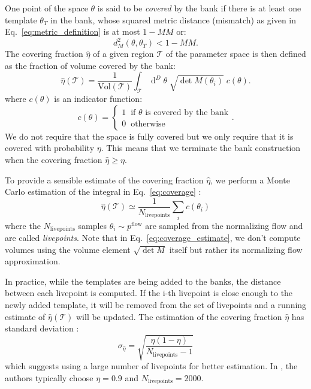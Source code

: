 \documentclass[twocolumn,showpacs,preprintnumbers,nofootinbib,prd,
superscriptaddress,10pt]{revtex4-2}
\newcommand{\dvol}[2]{\ensuremath{\operatorname{d}^{#2}\!{#1}}}
\begin{document}
One point of the space $\theta$ is said to be {\it covered} by the bank if there is at least one template $\theta_T$ in the bank, whose squared metric distance (mismatch) as given in Eq.~\eqref{eq:metric_definition} is at most $1 - MM$ or:
\begin{equation}
	d^2_M(\theta, \theta_T)<1 - MM.
\end{equation}
%
The covering fraction $\hat{\eta}$ of a given region $\mathcal{T}$ of the parameter space is then defined as the fraction of volume covered by the bank:
\begin{equation}\label{eq:coverage}
	\hat{\eta}(\mathcal{T}) = \frac{1}{\text{Vol}(\mathcal{T})} \int_\mathcal{T} \dvol{\theta}{D} \; \sqrt{\det M(\theta_i)} \; c(\theta).
\end{equation}
where $c(\theta)$ is an indicator function:
\begin{equation}
	c(\theta) = \left\{
                \begin{array}{ll}
                  1 \;\; \text{if $\theta$ is covered by the bank}\\
                  0 \;\; \text{otherwise}
                \end{array}.
              \right.
\end{equation}
%
We do not require that the space is fully covered but we only require that it is covered with probability $\eta$. This means that we terminate the bank construction when the covering fraction $\hat{\eta} \geq \eta$.

To provide a sensible estimate of the covering fraction $\hat{\eta}$, we perform a Monte Carlo estimation of the integral in Eq.~\eqref{eq:coverage} \cite{Coogan:2022qxs}:
\begin{equation}\label{eq:coverage_estimate}
	\hat{\eta}(\mathcal{T}) \simeq \frac{1}{N_\text{livepoints}} \sum_i c(\theta_i)
\end{equation}
%
where the $N_\text{livepoints}$ samples $\theta_i \sim p^\text{flow}$ are sampled from the normalizing flow and are called {\it livepoints}.
Note that in Eq.~\eqref{eq:coverage_estimate}, we don't compute volumes using the volume element $\sqrt{\det M}$ itself but rather its normalizing flow approximation.

In practice, while the templates are being added to the banks, the distance between each livepoint is computed. If the i-th livepoint is close enough to the newly added template, it will be removed from the set of livepoints and a running estimate of $\hat{\eta}(\mathcal{T})$ will be updated.
The estimation of the covering fraction $\hat{\eta}$ has standard deviation \cite[App. A]{Coogan:2022qxs}:
\begin{equation}\label{eq:variance_coverage}
	\sigma_{\hat{\eta}} = \sqrt{\frac{\eta(1-\eta)}{N_\text{livepoints}-1}}
\end{equation}
which suggests using a large number of livepoints for better estimation.
In \cite{Coogan:2022qxs}, the authors typically choose $\eta = 0.9$ and $N_\text{livepoints} = 2000$.
\end{document}
